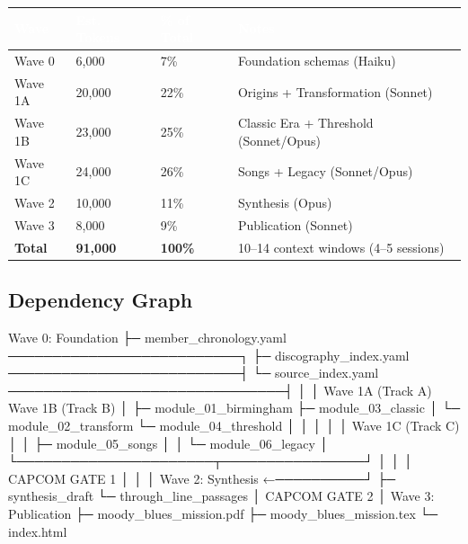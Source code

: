 \documentclass[11pt,letterpaper]{article}
\newcommand{\tableheader}[1]{\textbf{\sffamily\textcolor{white}{#1}}}
\begin{document}
\begin{center}
\begin{tabularx}{\textwidth}{L{3cm}C{2cm}C{2cm}X}
\toprule
{}
\tableheader{Wave} & \tableheader{Est. Tokens} & \tableheader{\% of Total} & \tableheader{Notes} \\
\midrule
Wave 0 & 6,000 & 7\% & Foundation schemas (Haiku) \\
Wave 1A & 20,000 & 22\% & Origins + Transformation (Sonnet) \\
Wave 1B & 23,000 & 25\% & Classic Era + Threshold (Sonnet/Opus) \\
Wave 1C & 24,000 & 26\% & Songs + Legacy (Sonnet/Opus) \\
Wave 2 & 10,000 & 11\% & Synthesis (Opus) \\
Wave 3 & 8,000 & 9\% & Publication (Sonnet) \\
\midrule
{}
\textbf{Total} & \textbf{91,000} & \textbf{100\%} & 10--14 context windows (4--5 sessions) \\
\bottomrule
\end{tabularx}
\end{center}

\subsection{Dependency Graph}

\begin{asciibox}
 Wave 0: Foundation
   ├─ member_chronology.yaml ──────────────────────────┐
   ├─ discography_index.yaml ──────────────────────────┤
   └─ source_index.yaml ───────────────────────────────┤
          │                                            │
   Wave 1A (Track A)           Wave 1B (Track B)       │
   ├─ module_01_birmingham      ├─ module_03_classic    │
   └─ module_02_transform       └─ module_04_threshold  │
          │                            │               │
          │                     Wave 1C (Track C)       │
          │                     ├─ module_05_songs      │
          │                     └─ module_06_legacy     │
          └──────────────────────┬────────────────┘   │
                                 │                     │
                          CAPCOM GATE 1               │
                                 │                     │
                          Wave 2: Synthesis ←──────────┘
                          ├─ synthesis_draft
                          └─ through_line_passages
                                 │
                          CAPCOM GATE 2
                                 │
                          Wave 3: Publication
                          ├─ moody_blues_mission.pdf
                          ├─ moody_blues_mission.tex
                          └─ index.html
\end{asciibox}
\end{document}
